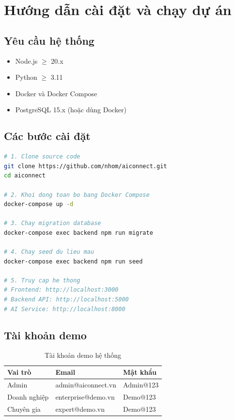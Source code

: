 \chapter{Hướng dẫn cài đặt và chạy dự án}

\section{Yêu cầu hệ thống}

\begin{itemize}
  \item Node.js $\geq$ 20.x
  \item Python $\geq$ 3.11
  \item Docker và Docker Compose
  \item PostgreSQL 15.x (hoặc dùng Docker)
\end{itemize}

\section{Các bước cài đặt}

\begin{lstlisting}[language=bash, caption={Cài đặt và khởi động hệ thống}]
# 1. Clone source code
git clone https://github.com/nhom/aiconnect.git
cd aiconnect

# 2. Khoi dong toan bo bang Docker Compose
docker-compose up -d

# 3. Chay migration database
docker-compose exec backend npm run migrate

# 4. Chay seed du lieu mau
docker-compose exec backend npm run seed

# 5. Truy cap he thong
# Frontend: http://localhost:3000
# Backend API: http://localhost:5000
# AI Service: http://localhost:8000
\end{lstlisting}

\section{Tài khoản demo}

\begin{table}[H]
\centering
\begin{tabular}{lll}
\toprule
\textbf{Vai trò} & \textbf{Email} & \textbf{Mật khẩu} \\
\midrule
Admin      & admin@aiconnect.vn    & Admin@123 \\
Doanh nghiệp & enterprise@demo.vn  & Demo@123  \\
Chuyên gia & expert@demo.vn        & Demo@123  \\
\bottomrule
\end{tabular}
\caption{Tài khoản demo hệ thống}
\end{table}
